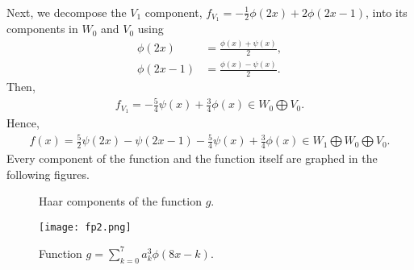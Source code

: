 \begin{questions}
\begin{solution}
\begin{align*}
\end{align*}
Next, we decompose the $V_1$ component, $f_{V_1}=-\frac{1}{2}\phi\left(2x\right)+2\phi\left(2x-1\right)$, into its components in $W_0$ and $V_0$ using
\begin{align*}
\phi\left(2x\right)&=\frac{\phi\left(x\right)+\psi\left(x\right)}{2},\\
\phi\left(2x-1\right)&=\frac{\phi\left(x\right)-\psi\left(x\right)}{2}.
\end{align*}
Then,
\begin{align*}
f_{V_1}=-\frac{5}{4}\psi\left(x\right)+\frac{3}{4}\phi\left(x\right)\in W_0\bigoplus V_0.
\end{align*}
Hence,
\begin{align*}
f(x)=\frac{5}{2}\psi\left(2x\right)-\psi\left(2x-1\right)-\frac{5}{4}\psi\left(x\right)+\frac{3}{4}\phi\left(x\right)\in W_1\bigoplus W_0\bigoplus V_0.
\end{align*}
Every component of the function and the function itself are graphed in the following figures.

\begin{figure}[H]
\centering     %
\hspace*{\fill}
\hfill
{}
\hfill
{}
\hfill
{}
\hspace*{\fill}
\caption{Haar components of the function $g$.}
\end{figure}

\begin{figure}[H]
\centering     %
{\texttt{[image: fp2.png]}}
\caption{Function $g=\sum_{k=0}^{7}a_k^3\phi(8x-k)$.}
\end{figure}
\end{solution}
\end{questions}
